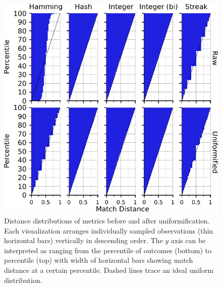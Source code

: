 \begin{figure}
\begin{center}

\includegraphics[width=\columnwidth]{img/uniformification/bitweight=0dot5+seed=1+title=low-score-distribution+_data_hathash_hash=75684cf1e73fb7f1+_script_fullcat_hash=c3113c80efb02374+ext=}
\caption{
Distance distributions of metrics before and after uniformification.
Each visualization arranges individually sampled observations (thin horizontal bars) vertically in descending order.
The $y$ axis can be interpreted as ranging from the  percentile of outcomes (bottom) to  percentile (top) with width of horizontal bars showing match distance at a certain percentile.
Dashed lines trace an ideal uniform distribution.
}
\label{fig:uniformification_supp}

\end{center}
\end{figure}

